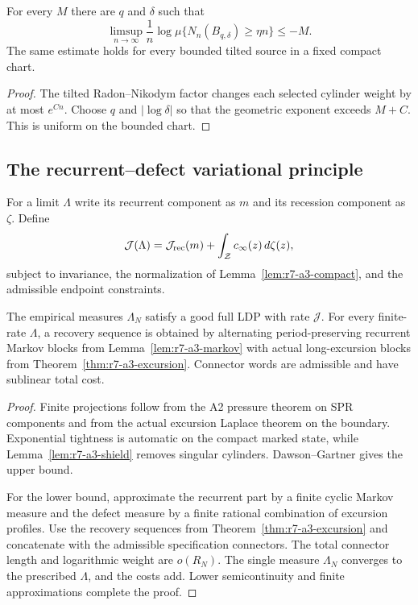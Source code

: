 \begin{lemma}
\label{lem:r7-a3-shield}
For every $M$ there are $q$ and $\delta$ such that
\[
 \limsup_{n\to\infty}\frac1n
 \log\mu\{N_n(B_{q,\delta})\ge\eta n\}\le-M.
\]
The same estimate holds for every bounded tilted source in a fixed compact
chart.
\end{lemma}

\begin{proof}
The tilted Radon--Nikodym factor changes each selected cylinder weight by at
most $e^{Cn}$.  Choose $q$ and $|\log\delta|$ so that the geometric exponent
exceeds $M+C$.  This is uniform on the bounded chart.
\end{proof}

\subsection{The recurrent--defect variational principle}

For a limit $\Lambda$ write its recurrent component as $m$ and its recession
component as $\zeta$.  Define
\[
 \mathcal J(\Lambda)=\mathcal J_{\rm rec}(m)
 +\int_{\mathcal Z}c_\infty(z)\,d\zeta(z),
\]
subject to invariance, the normalization of
Lemma~\ref{lem:r7-a3-compact}, and the admissible endpoint constraints.

\begin{theorem}
\label{thm:r7-a3-collision}
The empirical measures $\Lambda_N$ satisfy a good full LDP with rate
$\mathcal J$.  For every finite-rate $\Lambda$, a recovery sequence is obtained
by alternating period-preserving recurrent Markov blocks from
Lemma~\ref{lem:r7-a3-markov} with actual long-excursion blocks from
Theorem~\ref{thm:r7-a3-excursion}.  Connector words are admissible and have
sublinear total cost.
\end{theorem}

\begin{proof}
Finite projections follow from the A2 pressure theorem on SPR components and
from the actual excursion Laplace theorem on the boundary.  Exponential
tightness is automatic on the compact marked state, while
Lemma~\ref{lem:r7-a3-shield} removes singular cylinders.  Dawson--Gartner gives
the upper bound.

For the lower bound, approximate the recurrent part by a finite cyclic Markov
measure and the defect measure by a finite rational combination of excursion
profiles.  Use the recovery sequences from
Theorem~\ref{thm:r7-a3-excursion} and concatenate with the admissible
specification connectors.  The total connector length and logarithmic weight
are $o(R_N)$.  The single measure $\Lambda_N$ converges to the prescribed
$\Lambda$, and the costs add.  Lower semicontinuity and finite approximations
complete the proof.
\end{proof}

